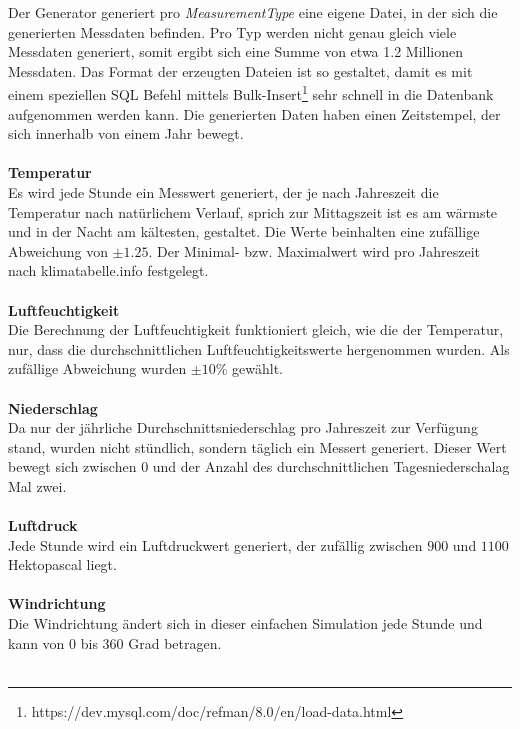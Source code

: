 Der Generator generiert pro \textit{MeasurementType} eine eigene Datei, in der sich die generierten Messdaten befinden. Pro Typ werden nicht genau gleich viele Messdaten generiert, somit ergibt sich eine Summe von etwa 1.2 Millionen Messdaten. Das Format der erzeugten Dateien ist so gestaltet, damit es mit einem speziellen SQL Befehl mittels Bulk-Insert\footnote{https://dev.mysql.com/doc/refman/8.0/en/load-data.html} sehr schnell in die Datenbank aufgenommen werden kann. Die generierten Daten haben einen Zeitstempel, der sich innerhalb von einem Jahr bewegt.~\\~\\ %

\textbf{Temperatur}\\
Es wird jede Stunde ein Messwert generiert, der je nach Jahreszeit die Temperatur nach natürlichem Verlauf, sprich zur Mittagszeit ist es am wärmste und in der Nacht am kältesten, gestaltet. Die Werte beinhalten eine zufällige Abweichung von $\pm 1.25$. Der Minimal- bzw. Maximalwert wird pro Jahreszeit nach klimatabelle.info festgelegt.~\\~\\ %

\textbf{Luftfeuchtigkeit}\\
Die Berechnung der Luftfeuchtigkeit funktioniert gleich, wie die der Temperatur, nur, dass die durchschnittlichen Luftfeuchtigkeitswerte hergenommen wurden. Als zufällige Abweichung wurden $\pm10\%$ gewählt.~\\~\\ %

\textbf{Niederschlag}\\
Da nur der jährliche Durchschnittsniederschlag pro Jahreszeit zur Verfügung stand, wurden nicht stündlich, sondern täglich ein Messert generiert. Dieser Wert bewegt sich zwischen $0$ und der Anzahl des durchschnittlichen Tagesniederschalag Mal zwei.~\\~\\ %

\textbf{Luftdruck}\\
Jede Stunde wird ein Luftdruckwert generiert, der zufällig zwischen $900$ und $1100$ Hektopascal liegt.~\\~\\ %

\textbf{Windrichtung}\\
Die Windrichtung ändert sich in dieser einfachen Simulation jede Stunde und kann von $0$ bis $360$ Grad betragen.~\\~\\ %

